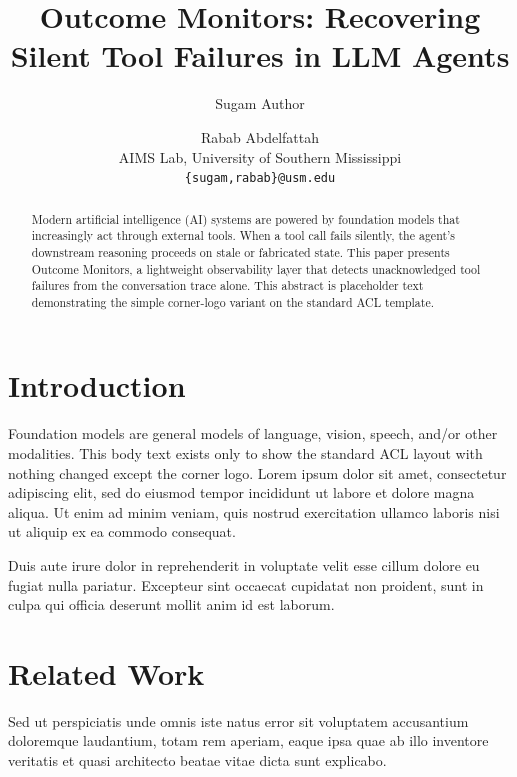 \documentclass[11pt]{article}
\title{Outcome Monitors: Recovering Silent Tool Failures in LLM Agents}
\author{Sugam Author \and Rabab Abdelfattah \\
  AIMS Lab, University of Southern Mississippi \\
  \texttt{\{sugam,rabab\}@usm.edu}}
\begin{document}
\aimscornerlogo
\maketitle

\begin{abstract}
Modern artificial intelligence (AI) systems are powered by foundation models
that increasingly act through external tools. When a tool call fails
silently, the agent's downstream reasoning proceeds on stale or fabricated
state. This paper presents Outcome Monitors, a lightweight observability
layer that detects unacknowledged tool failures from the conversation trace
alone. This abstract is placeholder text demonstrating the simple corner-logo
variant on the standard ACL template.
\end{abstract}

\section{Introduction}

Foundation models are general models of language, vision, speech, and/or
other modalities. This body text exists only to show the standard ACL layout
with nothing changed except the corner logo. Lorem ipsum dolor sit amet,
consectetur adipiscing elit, sed do eiusmod tempor incididunt ut labore et
dolore magna aliqua. Ut enim ad minim veniam, quis nostrud exercitation
ullamco laboris nisi ut aliquip ex ea commodo consequat.

Duis aute irure dolor in reprehenderit in voluptate velit esse cillum dolore
eu fugiat nulla pariatur. Excepteur sint occaecat cupidatat non proident,
sunt in culpa qui officia deserunt mollit anim id est laborum.

\section{Related Work}

Sed ut perspiciatis unde omnis iste natus error sit voluptatem accusantium
doloremque laudantium, totam rem aperiam, eaque ipsa quae ab illo inventore
veritatis et quasi architecto beatae vitae dicta sunt explicabo.
\end{document}
